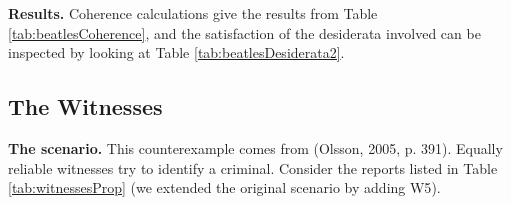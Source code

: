 \documentclass[
  10pt,
]{scrartcl}
\newcommand{\s}[1]{\textsf{#1}}
\begin{document}
\textbf{Results.} Coherence calculations give the results from Table \ref{tab:beatlesCoherence}, and the satisfaction of the desiderata involved can be inspected by looking at Table \ref{tab:beatlesDesiderata2}.

\begin{table}[H]

\caption{\label{tab:beatlesCoherence}Coherence scores in the Beatles scenario (rounded).}
\centering
{}
\end{table}

\begin{table}[H]

\caption{\label{tab:beatlesDesiderata2}Desiderata satisfaction in the Beatles scenario.}
\centering
{}
\end{table}

\hypertarget{the-witnesses}{%
\subsection{The Witnesses}\label{the-witnesses}}

\textbf{The scenario.} This counterexample comes from (Olsson, 2005, p. 391). Equally reliable witnesses try to identify a criminal. Consider the reports listed in Table \ref{tab:witnessesProp} (we extended the original scenario by adding \s{W5}).
\end{document}
